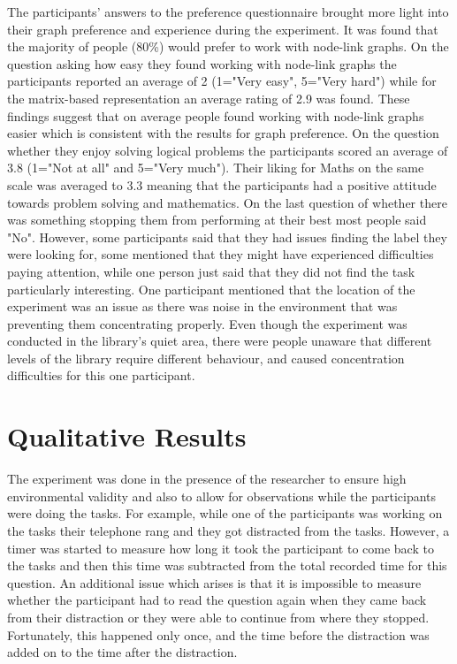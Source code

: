 \documentclass{l4proj}
\begin{document}
The participants' answers to the preference questionnaire brought more light into their graph preference and experience during the experiment. It was found that the majority of people (80\%) would prefer to work with node-link graphs. On the question asking how easy they found working with node-link graphs the participants reported an average of 2 (1="Very easy", 5="Very hard") while for the matrix-based representation an average rating of 2.9 was found. These findings suggest that on average people found working with node-link graphs easier which is consistent with the results for graph preference. On the question whether they enjoy solving logical problems the participants scored an average of 3.8 (1="Not at all" and 5="Very much"). Their liking for Maths on the same scale was averaged to 3.3 meaning that the participants had a positive attitude towards problem solving and mathematics. On the last question of whether there was something stopping them from performing at their best most people said "No". However, some participants said that they had issues finding the label they were looking for, some mentioned that they might have experienced difficulties paying attention, while one person just said that they did not find the task particularly interesting. One participant mentioned that the location of the experiment was an issue as there was noise in the environment that was preventing them concentrating properly. Even though the experiment was conducted in the library's quiet area, there were people unaware that different levels of the library require different behaviour, and caused concentration difficulties for this one participant.


\section{Qualitative Results}

The experiment was done in the presence of the researcher to ensure high environmental validity and also to allow for  observations while the participants were doing the tasks. For example, while one of the participants was working on the tasks their telephone rang and they got distracted from the tasks. However, a timer was started to measure how long it took the participant to come back to the tasks and then this time was subtracted from the total recorded time for this question. An additional issue which arises is that it is impossible to measure whether the participant had to read the question again when they came back from their distraction or they were able to continue from where they stopped. Fortunately, this happened only once, and the time before the distraction was added on to the time after the distraction.
\end{document}
